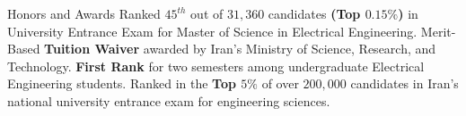 \begin{rubric}{Honors and Awards}
\entry*[2017] Ranked $45^{th}$ out of $31,360$ candidates \textbf{(Top $0.15\%$)} in University Entrance Exam for Master of Science in Electrical Engineering.
\entry*[2017\hspace{0pt}] Merit-Based \textbf{Tuition Waiver} awarded by Iran's Ministry of Science, Research, and Technology.
\entry*[2016] \textbf{First Rank} for two semesters among undergraduate Electrical Engineering students.
\entry*[2013] Ranked in the \textbf{Top $5\%$} of over $200,000$ candidates in Iran’s national university entrance exam for engineering sciences.
\end{rubric}